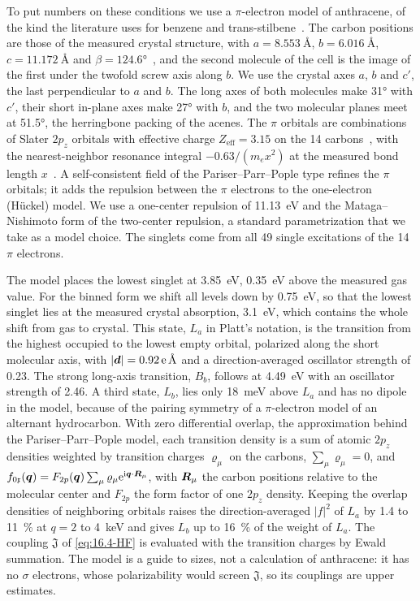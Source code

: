 To put numbers on these conditions we use a $\pi$-electron model of anthracene, of the kind the literature uses for benzene and trans-stilbene~\cite{blanco2020dark,blanco2021dark}. The carbon positions are those of the measured crystal structure, with $a = \SI{8.553}{\angstrom}$, $b = \SI{6.016}{\angstrom}$, $c = \SI{11.172}{\angstrom}$ and $\beta = \ang{124.6}$~\cite{brock1990temperature}, and the second molecule of the cell is the image of the first under the twofold screw axis along $b$. We use the crystal axes $a$, $b$ and $c'$, the last perpendicular to $a$ and $b$. The long axes of both molecules make \ang{31} with $c'$, their short in-plane axes make \ang{27} with $b$, and the two molecular planes meet at \ang{51.5}, the herringbone packing of the acenes. The $\pi$ orbitals are combinations of Slater $2p_z$ orbitals with effective charge $Z_{\mathrm{eff}} = 3.15$ on the 14 carbons~\cite[Eq.~(2)]{blanco2020dark}, with the nearest-neighbor resonance integral $-0.63/(m_ex^2)$ at the measured bond length $x$~\cite[Eq.~(A1)]{blanco2021dark}. A self-consistent field of the Pariser--Parr--Pople type refines the $\pi$ orbitals; it adds the repulsion between the $\pi$ electrons to the one-electron (H\"uckel) model. We use a one-center repulsion of \SI{11.13}{eV} and the Mataga--Nishimoto form of the two-center repulsion, a standard parametrization that we take as a model choice. The singlets come from all 49 single excitations of the 14 $\pi$ electrons.

The model places the lowest singlet at \SI{3.85}{eV}, \SI{0.35}{eV} above the measured gas value. For the binned form we shift all levels down by \SI{0.75}{eV}, so that the lowest singlet lies at the measured crystal absorption, \SI{3.1}{eV}, which contains the whole shift from gas to crystal. This state, $L_a$ in Platt's notation, is the transition from the highest occupied to the lowest empty orbital, polarized along the short molecular axis, with $|\bm{d}| = \SI{0.92}{e.\angstrom}$ and a direction-averaged oscillator strength of 0.23. The strong long-axis transition, $B_b$, follows at \SI{4.49}{eV} with an oscillator strength of 2.46. A third state, $L_b$, lies only \SI{18}{meV} above $L_a$ and has no dipole in the model, because of the pairing symmetry of a $\pi$-electron model of an alternant hydrocarbon. With zero differential overlap, the approximation behind the Pariser--Parr--Pople model, each transition density is a sum of atomic $2p_z$ densities weighted by transition charges $\varrho_\mu$ on the carbons, $\sum_\mu \varrho_\mu = 0$, and $f_{0\mathfrak{x}}(\bm{q}) = F_{2p}(\bm{q})\sum_\mu \varrho_\mu\mathrm{e}^{\mathrm{i}\bm{q}\cdot\bm{R}_\mu}$, with $\bm{R}_\mu$ the carbon positions relative to the molecular center and $F_{2p}$ the form factor of one $2p_z$ density. Keeping the overlap densities of neighboring orbitals raises the direction-averaged $|f|^2$ of $L_a$ by 1.4 to \SI{11}{\percent} at $q = 2$ to \SI{4}{keV} and gives $L_b$ up to \SI{16}{\percent} of the weight of $L_a$. The coupling $\mathfrak{J}$ of \cref{eq:16.4-HF} is evaluated with the transition charges by Ewald summation. The model is a guide to sizes, not a calculation of anthracene: it has no $\sigma$ electrons, whose polarizability would screen $\mathfrak{J}$, so its couplings are upper estimates.

